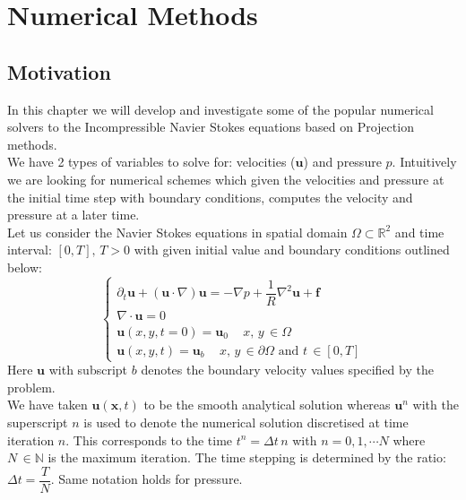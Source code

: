 \chapter{Numerical Methods}
\label{chapter3}
\section{Motivation}
In this chapter we will develop and investigate some of the popular numerical solvers to the Incompressible Navier Stokes equations based on Projection methods.\\

We have 2 types of variables to solve for: velocities ($\textbf{u}$) and pressure $p$. Intuitively we are looking for numerical schemes which given the velocities and pressure at the initial time step with boundary conditions, computes the velocity and pressure at a later time.\\

Let us consider the Navier Stokes equations in spatial domain $\Omega \subset \mathbb{R}^2$ and time interval: $[0,T],\,T>0$ with given initial value and boundary conditions outlined below:
\begin{equation}
\begin{cases}
\partial_t \textbf{u} + (\textbf{u} \cdot \nabla)\textbf{u} = -\nabla p + \dfrac{1}{R}\nabla^2\textbf{u} + \textbf{f}\\
\nabla \cdot \textbf{u}=0\\
\textbf{u}(x,y,t=0) = \textbf{u}_0\,\,\,\text{   $x,\,y\,\in \Omega$}\\
\textbf{u}(x,y,t) = \textbf{u}_b\,\,\,\text{   $x,\,y\,\in \partial\Omega$ and $t\,\in [0,T]$}
\end{cases}
\end{equation} 
Here $\textbf{u}$ with subscript $b$ denotes the boundary velocity values specified by the problem.\\

We have taken $\textbf{u}(\textbf{x},t)$ to be the smooth analytical solution whereas $\textbf{u}^n$ with the superscript $n$ is used to denote the numerical solution discretised at time iteration $n$. This corresponds to the time $t^n = \Delta t\,n$ with $n = 0,1,\cdots N$ where $N\,\in \mathbb{N}$ is the maximum iteration. The time stepping is determined by the ratio: $\Delta t=\dfrac{T}{N}$. Same notation holds for pressure.\\

